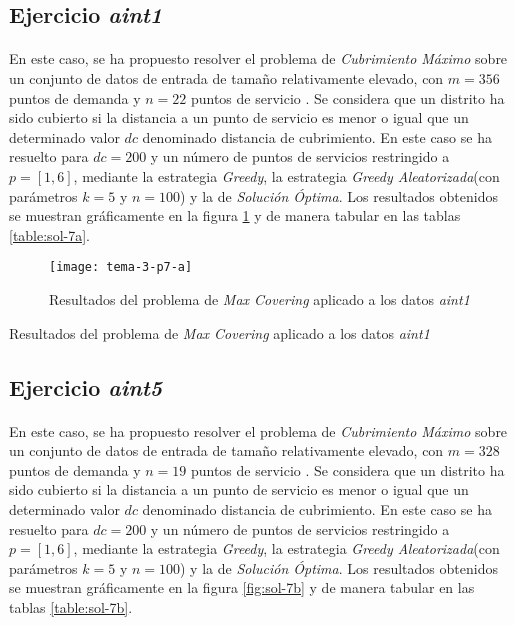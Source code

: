 \documentclass[spanish]{article}
\begin{document}
		\subsection{Ejercicio \emph{aint1}}
		\label{sec:e-7a}

			\paragraph{}
			En este caso, se ha propuesto resolver el problema de \emph{Cubrimiento Máximo} sobre un conjunto de datos de entrada de tamaño relativamente elevado, con $m = 356$ puntos de demanda y $n=22$ puntos de servicio . Se considera que un distrito ha sido cubierto si la distancia a un punto de servicio es menor o igual que un determinado valor $dc$ denominado distancia de cubrimiento. En este caso se ha resuelto para $dc = 200$ y un número de puntos de servicios restringido a $p = [1,6]$, mediante la estrategia \emph{Greedy}, la estrategia \emph{Greedy Aleatorizada}(con parámetros $k=5$ y $n=100$) y la de \emph{Solución Óptima}. Los resultados obtenidos se muestran gráficamente en la figura \ref{fig:sol-7a} y de manera tabular en las tablas \ref{table:sol-7a}.

			\begin{figure}[h]
				\begin{center}
					\texttt{[image: tema-3-p7-a]}
				\end{center}
				\caption{Resultados del problema de \emph{Max Covering} aplicado a los datos \emph{aint1}}
				\label{fig:sol-7a}
			\end{figure}

			\begin{table}[h]
				\begin{center}
				\end{center}
				\caption{Resultados del problema de \emph{Max Covering} aplicado a los datos \emph{aint1}}
				\label{table:sol-7a}
			\end{table}

		\subsection{Ejercicio \emph{aint5}}
		\label{sec:e-7b}

			\paragraph{}
			En este caso, se ha propuesto resolver el problema de \emph{Cubrimiento Máximo} sobre un conjunto de datos de entrada de tamaño relativamente elevado, con $m = 328$ puntos de demanda y $n=19$ puntos de servicio . Se considera que un distrito ha sido cubierto si la distancia a un punto de servicio es menor o igual que un determinado valor $dc$ denominado distancia de cubrimiento. En este caso se ha resuelto para $dc = 200$ y un número de puntos de servicios restringido a $p = [1,6]$, mediante la estrategia \emph{Greedy}, la estrategia \emph{Greedy Aleatorizada}(con parámetros $k=5$ y $n=100$) y la de \emph{Solución Óptima}. Los resultados obtenidos se muestran gráficamente en la figura \ref{fig:sol-7b} y de manera tabular en las tablas \ref{table:sol-7b}.
\end{document}
